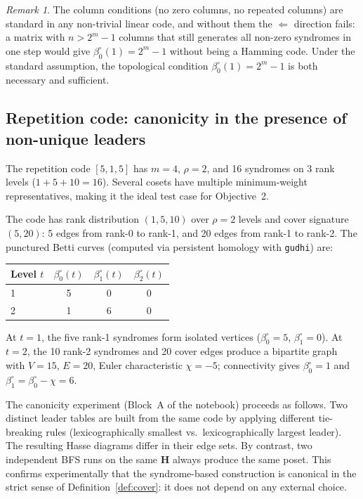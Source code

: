 \documentclass[11pt,twoside,leqno]{article}
\theoremstyle{definition}
\theoremstyle{plain}
\theoremstyle{remark}
\newtheorem{remark}[definition]{Remark}
\newcommand{\HH}{\mathbf{H}}
\newcommand{\covrad}{\rho}
\begin{document}
\begin{remark}
The column conditions (no zero columns, no repeated columns) are standard in any non-trivial
linear code, and without them the $\Leftarrow$ direction fails: a matrix with $n>2^m-1$ columns
that still generates all non-zero syndromes in one step would give $\beta_0^\circ(1)=2^m-1$
without being a Hamming code. Under the standard assumption, the topological condition
$\beta_0^\circ(1)=2^m-1$ is both necessary and sufficient.
\end{remark}

\subsection{Repetition code: canonicity in the presence of non-unique leaders}
\label{sec:res:repetition}

The repetition code $[5,1,5]$ has $m=4$, $\covrad=2$, and 16 syndromes on 3 rank levels
($1+5+10=16$). Several cosets have multiple minimum-weight representatives, making it the
ideal test case for Objective~2.

The code has rank distribution $(1,5,10)$ over $\covrad=2$ levels and cover signature $(5,20)$:
5 edges from rank-0 to rank-1, and 20 edges from rank-1 to rank-2. The punctured Betti curves
(computed via persistent homology with \texttt{gudhi}) are:
\begin{center}
\begin{tabular}{lccc}
\toprule
Level $t$ & $\beta_0^\circ(t)$ & $\beta_1^\circ(t)$ & $\beta_2^\circ(t)$ \\
\midrule
1 & 5 & 0 & 0 \\
2 & 1 & 6 & 0 \\
\bottomrule
\end{tabular}
\end{center}
At $t=1$, the five rank-1 syndromes form isolated vertices ($\beta_0^\circ=5$, $\beta_1^\circ=0$).
At $t=2$, the 10 rank-2 syndromes and 20 cover edges produce a bipartite graph with
$V=15$, $E=20$, Euler characteristic $\chi=-5$; connectivity gives $\beta_0^\circ=1$
and $\beta_1^\circ = \beta_0^\circ - \chi = 6$.

The canonicity experiment (Block~A of the notebook) proceeds as follows. Two distinct leader
tables are built from the same code by applying different tie-breaking rules (lexicographically
smallest vs.\ lexicographically largest leader). The resulting Hasse diagrams differ in their
edge sets. By contrast, two independent BFS runs on the same $\HH$ always produce the same
poset. This confirms experimentally that the syndrome-based construction is canonical in the
strict sense of Definition~\ref{def:cover}: it does not depend on any external choice.
\end{document}

